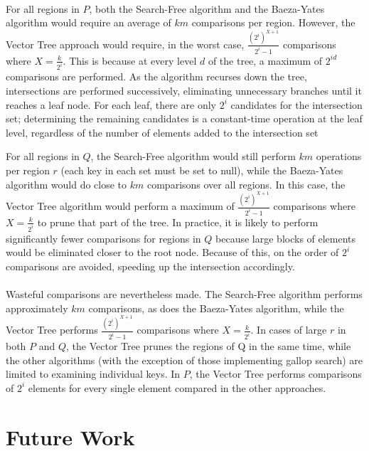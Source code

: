 \documentclass[11pt,letterpaper]{article}
\begin{document}
\paragraph{}
For all regions in $P$, both the Search-Free algorithm and the
Baeza-Yates algorithm would require an average of $km$ comparisons
per region.  However, the Vector Tree approach would require, in the
worst case, $\frac{(2^i)^{X+1}}{2^i-1}$ comparisons where $X=\frac{k}{2^i}$.
This is because at every level $d$ of the tree, a maximum of $2^{id}$
comparisons are performed.  As the algorithm recurses down the tree,
intersections are performed successively, eliminating unnecessary branches
until it reaches a leaf node.  For each leaf, there are only $2^i$ candidates for
the intersection set; determining the remaining candidates is a constant-time
operation at the leaf level, regardless of the number of elements added to the
intersection set

For all regions in $Q$, the Search-Free algorithm would still
perform $km$ operations per region $r$ (each key in each set must
be set to null), while the Baeza-Yates algorithm would do close to $km$
comparisons over all regions. In this case, the Vector Tree algorithm
would perform a maximum of $\frac{(2^i)^{X+1}}{2^i-1}$ comparisons
where $X=\frac{k}{2^i}$ to prune that part of the tree. In practice, it is
likely to perform significantly fewer comparisons for regions in $Q$ because
large blocks of elements would be eliminated closer to the root node.
Because of this, on the order of $2^i$ comparisons are avoided, speeding
up the intersection accordingly. 

\paragraph{}
Wasteful comparisons are nevertheless made.  The Search-Free algorithm
performs approximately $km$ comparisons, as does the Baeza-Yates
algorithm, while the Vector Tree performs $\frac{(2^i)^{X+1}}{2^i-1}$
comparisons where $X=\frac{k}{2^i}$. In cases of large $r$ in both $P$
and $Q$, the Vector Tree prunes the regions of Q in the same time,
while the other algorithms (with the exception of those implementing gallop
search) are limited to examining individual keys.  In $P$, the Vector Tree
performs comparisons of $2^i$ elements for every single element compared
in the other approaches.

\section{Future Work}
\end{document}
